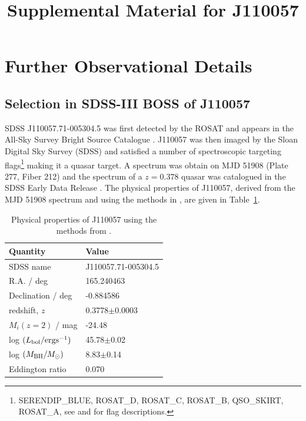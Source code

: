 \documentclass[11pt,a4paper]{article}
\begin{document}
   \title{Supplemental Material for J110057}
\maketitle


\section*{Further Observational Details}

\subsection*{Selection in SDSS-III BOSS of J110057}
SDSS J110057.71-005304.5 was first detected by the ROSAT and appears
in the All-Sky Survey Bright Source Catalogue \citep[RASS-BSC;
][]{Appenzeller1998, Voges1999}.  J110057 was then imaged by the Sloan
Digital Sky Survey (SDSS) and satisfied a number of spectroscopic
targeting flags\footnote{SERENDIP\_BLUE, ROSAT\_D, ROSAT\_C, ROSAT\_B,
QSO\_SKIRT, ROSAT\_A, see \citet{EDR} and \citet{Richards2002} for
flag descriptions.}  making it a quasar target. A spectrum was obtain
on MJD 51908 (Plate 277, Fiber 212) and the spectrum of a $z=0.378$
quasar was catalogued in the SDSS Early Data Release
\citep{Stoughton2002, Schneider2002}. The physical properties of
J110057, derived from the MJD 51908 spectrum and using the methods in
\citet{Shen2011}, are given in Table~\ref{tab:Shen_props}.

\begin{table}[]
    \centering
    \begin{tabular}{l l }
      \hline \hline 
      Quantity                                         &  Value \\
      \hline 
      SDSS name                                     &   J110057.71-005304.5 \\
      R.A. / deg                &  165.240463 \\
      Declination / deg    &   -0.884586 \\ 
      redshift, $z$                                    &   0.3778$\pm$0.0003  \\
      $M_{i}(z=2)$  / mag                          &   -24.48  \\
      log $(L_{\rm bol} / {\rm erg s}^{-1}) $  &  45.78$\pm$0.02 \\
      log $(M_{\rm BH} / M_{\odot})  $           &  8.83$\pm$0.14 \\
      Eddington ratio                                &        0.070 \\
      \hline \hline 
    \end{tabular}
    \caption{Physical properties of J110057 using the methods from 
      \citet{Shen2011}.} 
    \label{tab:Shen_props}
\end{table}
\end{document}
